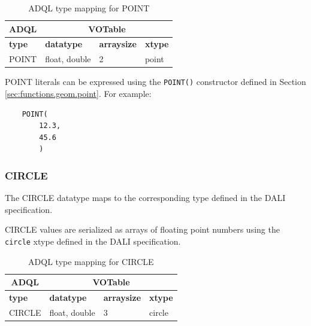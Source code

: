 \documentclass[11pt,a4paper]{ivoa}
\newcommand{\DALIspec}{DALI specification\xspace}
\newcommand{\SectionRef}[1]{Section \ref{#1}\xspace}
\begin{document}
\begin{table}[thm]\footnotesize
    \begin{tabular}
        {|p{}|p{}|p{}|p{}|}
        \hline

        \hline
        \multicolumn{1}{|c|}{\textbf{ADQL}} &
        \multicolumn{3}{|c|}{\textbf{VOTable}}
        \tabularnewline
        
        \hline
        \textbf{type} &
        \textbf{datatype} &
        \textbf{arraysize} &
        \textbf{xtype}
        \tabularnewline

        \hline
        POINT &
        float, double &
        2 &
        point
        \tabularnewline

        \hline
    \end{tabular}
    \caption{ADQL type mapping for POINT}
    \label{table:types.geom.point}
\end{table}

POINT literals can be expressed using the \verb:POINT():
constructor defined in \SectionRef{sec:functions.geom.point}.
For example:
\begin{verbatim}
    POINT(
        12.3,
        45.6
        )
\end{verbatim}


\subsubsection{CIRCLE}
\label{sec:types.geom.circle}

The CIRCLE datatype maps to the corresponding type defined in the
\DALIspec.

CIRCLE values are serialized as arrays of floating point numbers
using the \verb:circle: xtype defined in the \DALIspec.

\begin{table}[thm]\footnotesize
    \begin{tabular}
        {|p{}|p{}|p{}|p{}|}
        \hline

        \hline
        \multicolumn{1}{|c|}{\textbf{ADQL}} &
        \multicolumn{3}{|c|}{\textbf{VOTable}}
        \tabularnewline
        
        \hline
        \textbf{type} &
        \textbf{datatype} &
        \textbf{arraysize} &
        \textbf{xtype}
        \tabularnewline

        \hline
        CIRCLE &
        float, double &
        3 &
        circle
        \tabularnewline

        \hline
    \end{tabular}
    \caption{ADQL type mapping for CIRCLE}
    \label{table:types.geom.circle}
\end{table}
\end{document}
